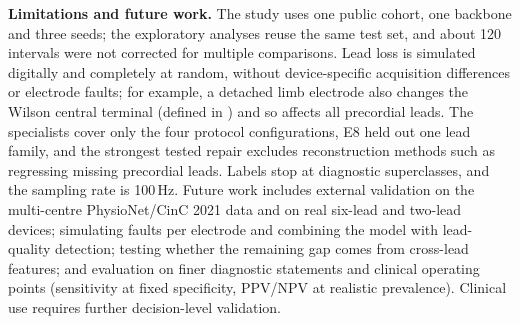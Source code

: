 \textbf{Limitations and future work.} The study uses one public cohort, one backbone and three seeds; the exploratory analyses reuse the same test set, and about 120 intervals were not corrected for multiple comparisons. Lead loss is simulated digitally and completely at random, without device-specific acquisition differences or electrode faults; for example, a detached limb electrode also changes the Wilson central terminal (defined in \citep{reyna2022issues}) and so affects all precordial leads. The specialists cover only the four protocol configurations, E8 held out one lead family, and the strongest tested repair excludes reconstruction methods such as regressing missing precordial leads. Labels stop at diagnostic superclasses, and the sampling rate is 100\,Hz. Future work includes external validation on the multi-centre PhysioNet/CinC 2021 data and on real six-lead and two-lead devices; simulating faults per electrode and combining the model with lead-quality detection; testing whether the remaining gap comes from cross-lead features; and evaluation on finer diagnostic statements and clinical operating points (sensitivity at fixed specificity, PPV/NPV at realistic prevalence). Clinical use requires further decision-level validation.
